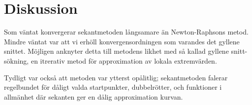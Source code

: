 \documentclass{article}
\begin{document}
\section{Diskussion}
Som väntat konvergerar sekantmetoden långsamare än Newton-Raphsons metod. Mindre väntat var att vi erhöll konvergensordningen som varandes det gyllene snittet. Möjligen anknyter detta till metodens likhet med så kallad gyllene snitt-sökning, en itrerativ metod för approximation av lokala extremvärden. 

Tydligt var också att metoden var ytterst opålitlig; sekantmetoden falerar regelbundet för dåligt valda startpunkter, dubbelrötter, och funktioner i allmänhet där sekanten ger en dålig approximation kurvan. 
\end{document}
